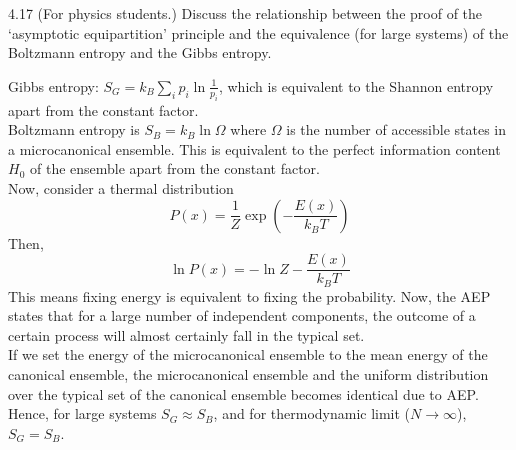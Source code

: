 \documentclass[12pt, a4paper]{article}
\begin{document}
\begin{prob}{4.17}
    (For physics students.) Discuss the relationship between the proof of the ‘asymptotic equipartition’ principle and the equivalence (for large systems) of the Boltzmann entropy and the Gibbs entropy.
\end{prob}
\begin{sol}
    Gibbs entropy: $S_G = k_B \sum_{i} p_i \ln \frac{1}{p_i}$, which is equivalent to the Shannon entropy apart from the constant factor. \\
    Boltzmann entropy is $S_B = k_B \ln \Omega$ where $\Omega$ is the number of accessible states in a microcanonical ensemble. This is equivalent to the perfect information content $H_0$ of the ensemble apart from the constant factor. \\
    Now, consider a thermal distribution $$P(x) = \frac{1}{Z} \exp(-\frac{E(x)}{k_B T})$$
    Then, $$\ln P(x) = -\ln Z - \frac{E(x)}{k_B T}$$
    This means fixing energy is equivalent to fixing the probability. Now, the AEP states that for a large number of independent components, the outcome of a certain process will almost certainly fall in the typical set. \\
    If we set the energy of the microcanonical ensemble to the mean energy of the canonical ensemble, the microcanonical ensemble and the uniform distribution over the typical set of the canonical ensemble becomes identical due to AEP. \\
    Hence, for large systems $S_G \approx S_B$, and for thermodynamic limit ($N \rightarrow \infty$), $S_G = S_B$.
\end{sol}
\bigskip
\end{document}
